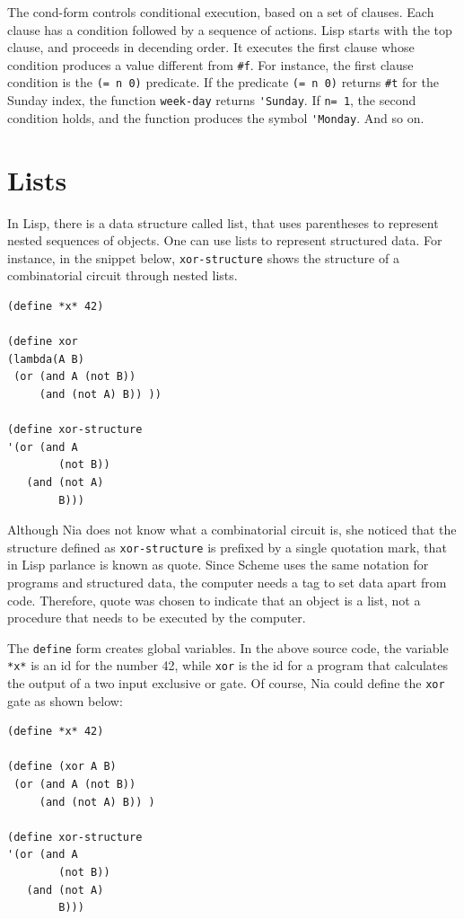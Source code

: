 \documentclass[a4paper,12pt]{book}
\begin{document}
The cond-form controls conditional
execution, based on a set of clauses.
Each clause has a condition followed by
a sequence of actions.  Lisp starts with the
top clause, and proceeds in decending order.
It executes the first clause whose 
condition produces a value different from \verb|#f|.
For instance, the first clause condition is
the \verb|(= n 0)| predicate.
If the predicate \verb|(= n 0)| 
returns \verb|#t| for the Sunday index,
the function \verb|week-day| returns \verb|'Sunday|.
If \verb|n= 1|, the second condition holds,
and the function produces the symbol \verb|'Monday|.
And so on.


\section{Lists}
In Lisp, there is a data structure called list,
that uses parentheses to represent nested
sequences of objects. One can use lists to
represent structured data.
For instance, in the snippet below,
\verb|xor-structure| shows
the structure of a combinatorial circuit
through nested lists.

\begin{verbatim}
(define *x* 42)

(define xor
(lambda(A B)
 (or (and A (not B))
     (and (not A) B)) ))

(define xor-structure
'(or (and A  
        (not B))
   (and (not A) 
        B)))
\end{verbatim}

Although Nia does not know what a combinatorial 
circuit is, she noticed that the structure
defined as \verb|xor-structure| is prefixed by a
single quotation mark, that in Lisp parlance is
known as quote. Since Scheme uses the
same notation for programs and structured
data, the computer needs a tag to set
data apart from code. Therefore, 
quote was chosen to indicate that
an object is a list, not a procedure that
needs to be executed by the computer.

The \verb|define| form creates global
variables. In the above source code,
the variable \verb|*x*| is an id for the
number 42,
while \verb|xor| is the id for a program
that calculates the output of a two
input exclusive or gate. Of course, Nia
could define the \verb|xor| gate as shown below:
\begin{verbatim}
(define *x* 42)

(define (xor A B)
 (or (and A (not B))
     (and (not A) B)) )

(define xor-structure
'(or (and A 
        (not B))
   (and (not A) 
        B)))
\end{verbatim}
\end{document}
